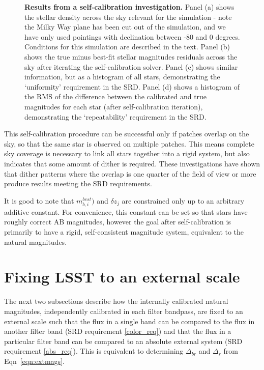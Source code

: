 \documentclass[12pt,preprint]{aastex}
\begin{document}
\begin{figure}
\caption{{\small
{\bf Results from a self-calibration investigation.} Panel (a) shows
the stellar density across the sky relevant for the simulation - note
the Milky Way plane has been cut out of the simulation, and we have
only used pointings with declination between -80 and 0 degrees.
Conditions for this simulation are described in the text.  Panel (b)
shows the true minus best-fit stellar magnitudes residuals across the
sky after iterating the self-calibration solver. Panel (c) shows
similar information, but as a histogram of all stars, demonstrating
the `uniformity'  requirement in the SRD. Panel (d) shows
a histogram of the RMS of the difference between the calibrated and
true magnitudes for each star (after self-calibration iteration),
demonstrating the `repeatability' requirement in the SRD. 
}}
\label{fig:selfcal_fiducial}
\end{figure}


This self-calibration procedure can be successful only if patches
overlap on the sky, so that the same star is observed on 
multiple patches. This means complete sky coverage is necessary to
link all stars together into a rigid system, but also indicates that
some amount of dither is required. These investigations have shown
that dither patterns where the overlap is one quarter of the field of
view or more produce results meeting the SRD requirements. 

It is good to note that $m_{b,i}^{best})$ and $\delta z_j$ are
constrained only up to an arbitrary additive constant. For
convenience, this constant can be set so that stars have roughly
correct AB magnitudes, however the goal after self-calibration is
primarily to have a rigid, self-consistent magnitude system,
equivalent to the natural magnitudes.


\section{Fixing LSST to an external scale}
\label{sec:calib_external}

The next two subsections describe how the internally calibrated
natural magnitudes, independently calibrated in each filter bandpass, are fixed
to an external scale such that the flux in a single band can be compared to the
flux in another filter band (SRD requirement \ref{color_req}) and that
the flux in a particular filter band can be compared to an absolute
external system (SRD requirement \ref{abs_req}). This is equivalent to
determining $\Delta_{br}$ and $\Delta_r$ from Eqn~\ref{eqn:extmags}. 
\end{document}

